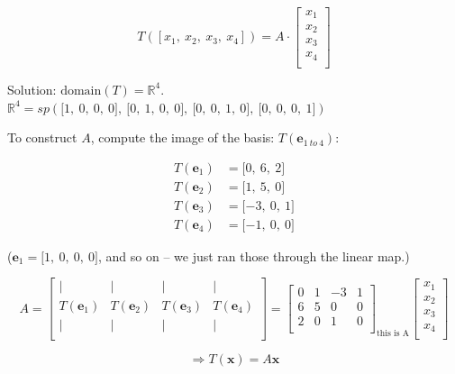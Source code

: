\documentclass[12pt]{article}
\theoremstyle{plain}
\theoremstyle{remark}
\theoremstyle{definition}
\begin{document}
\[T\left( \left\lbrack x_{1},\ x_{2},\ x_{3},\ x_{4} \right\rbrack \right) = A \cdot \begin{bmatrix}
x_{1} \\
x_{2} \\
x_{3} \\
x_{4} \\
\end{bmatrix}\]

Solution: \(\text{domain}(T) = \mathbb{R}^{4}\).
\(\mathbb{R}^{4} = sp\left( \lbrack 1,\ 0,\ 0,\ 0\rbrack,\ \lbrack 0,\ 1,\ 0,\ 0\rbrack,\ \lbrack 0,\ 0,\ 1,\ 0\rbrack,\ \lbrack 0,\ 0,\ 0,\ 1\rbrack \right)\)

To construct \(A\), compute the image of the basis:
\(T({\mathbf{e}}_{1\ to\ 4})\):

\begin{align*}
T\left( {\mathbf{e}}_{1} \right) &= \lbrack 0,\ 6,\ 2\rbrack \\
T\left( {\mathbf{e}}_{2} \right) &= \lbrack 1,\ 5,\ 0\rbrack \\
T\left( {\mathbf{e}}_{3} \right) &= \lbrack - 3,\ 0,\ 1\rbrack \\
T\left( {\mathbf{e}}_{4} \right) &= \lbrack - 1,\ 0,\ 0\rbrack
\end{align*}


(\({\mathbf{e}}_{1} = \lbrack 1,\ 0,\ 0,\ 0\rbrack\), and so on --
we just ran those through the linear map.)

\[{A }{= \begin{bmatrix}
 \mid & \mid & \mid & \mid \\
T\left( {\mathbf{e}}_{1} \right) & T\left( {\mathbf{e}}_{2} \right) & T\left( {\mathbf{e}}_{3} \right) & T\left( {\mathbf{e}}_{4} \right) \\
 \mid & \mid & \mid & \mid \\
\end{bmatrix} }{= \begin{bmatrix}
0 & 1 & - 3 & 1 \\
6 & 5 & 0 & 0 \\
2 & 0 & 1 & 0 \\
\end{bmatrix}_{\text{this\ is\ A}}\begin{bmatrix}
x_{1} \\
x_{2} \\
x_{3} \\
x_{4} \\
\end{bmatrix}} \]

\[\Rightarrow T\left( \mathbf{x} \right) = A\mathbf{x}\]
\end{document}
